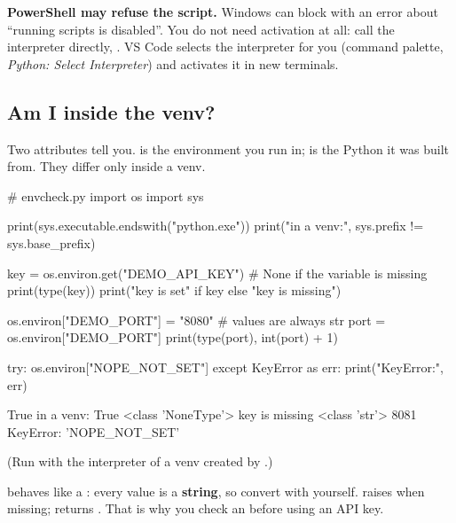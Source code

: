 \begin{trap}
\textbf{PowerShell may refuse the script.} Windows can block  with an error about
``running scripts is disabled''. You do not need activation at all: call the interpreter directly,
. VS Code selects the interpreter for you
(command palette, \emph{Python: Select Interpreter}) and activates it in new terminals.
\end{trap}

\subsection{Am I inside the venv?}

Two attributes tell you.  is the environment you run in;  is the Python
it was built from. They differ only inside a venv.

\begin{pycode}
# envcheck.py
import os
import sys

print(sys.executable.endswith("python.exe"))
print("in a venv:", sys.prefix != sys.base_prefix)

key = os.environ.get("DEMO_API_KEY")        # None if the variable is missing
print(type(key))
print("key is set" if key else "key is missing")

os.environ["DEMO_PORT"] = "8080"            # values are always str
port = os.environ["DEMO_PORT"]
print(type(port), int(port) + 1)

try:
    os.environ["NOPE_NOT_SET"]
except KeyError as err:
    print("KeyError:", err)
\end{pycode}
\begin{rawcode}
True
in a venv: True
<class 'NoneType'>
key is missing
<class 'str'> 8081
KeyError: 'NOPE_NOT_SET'
\end{rawcode}

(Run with the interpreter of a venv created by .)

\begin{typecheck}
 behaves like a : every value is a \textbf{string}, so convert with 
yourself.  raises  when missing;  returns
. That is why you check an  before using an API key.
\end{typecheck}

